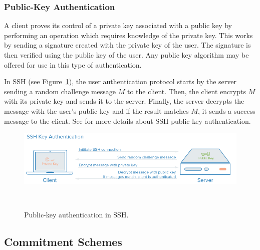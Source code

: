 \documentclass[11pt]{article}
\theoremstyle{plain}
\begin{document}
\subsubsection{Public-Key Authentication}

A client proves its control of a private key associated with a public
key by performing an operation which requires knowledge of the private
key. This works by sending a signature created with the private key
of the user. The signature is then verified using the public key of
the user. Any public key algorithm may be offered for use in this
type of authentication. 

In SSH (see Figure~\ref{fig:SSH-Auth}), the user authentication
protocol starts by the server sending a random challenge message $M$
to the client. Then, the client encrypts $M$ with its private key
and sends it to the server. Finally, the server decrypts the message
with the user's public key and if the result matches $M$, it sends
a success message to the client. See \cite{rfc4252} for more details
about SSH public-key authentication.

\begin{figure}
	\begin{description}
		\item [{\includegraphics[scale=0.7]{ssh-auth}}]~
	\end{description}
	\caption{Public-key authentication in SSH.}
	\label{fig:SSH-Auth}
\end{figure}


\subsection{Commitment Schemes }
\end{document}
